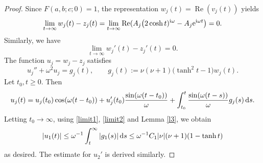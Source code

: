 \documentclass[10pt,a4paper]{amsart}
\numberwithin{equation}{section}
\begin{document}
\begin{proof}
Since $F(a,b;c;0)=1$, the representation $w_j(t)=\operatorname{Re}(v_j(t))$ yields
\begin{equation}\label{limit1}
\lim_{t\to\infty} w_j(t)-z_j(t)=\lim_{t\to\infty} \operatorname{Re}(A_j \bigl(2\cosh t)^{{\rm i}\omega}-A_j{\rm e}^{{\rm i}\omega t}\bigr) = 0.
\end{equation}
Similarly, we have
\begin{equation}\label{limit2}
 \lim_{t\to\infty} w_j'(t)-z_j'(t)=0 .
\end{equation}
The function $u_j=w_j-z_j$ satisfies
\[ u_j''+\omega^2 u_j=g_j(t), \qquad g_j(t):=\nu(\nu+1) \bigl(\tanh^2 t-1\bigr) w_j(t) .\]
Let $t_0, t\ge 0$. Then
\[ u_j(t)=u_j(t_0)\cos(\omega (t-t_0))+u_j'(t_0)\frac{\sin(\omega(t-t_0))}{\omega}+
\int_{t_0}^t \frac{\sin(\omega(t-s))}{\omega}g_j(s)\,{\rm d}s .\]
Letting $t_0\to\infty$, using \eqref{limit1}, \eqref{limit2} and Lemma \ref{l3}, we obtain
\[ |u_1(t)|\le\omega^{-1}\int_t^\infty |g_1(s)|\,{\rm d}s \le\omega^{-1}C_1|\nu|(\nu+1)(1-\tanh t) \]
as desired.
The estimate for $u_2'$ is derived similarly.
\end{proof}
\end{document}
